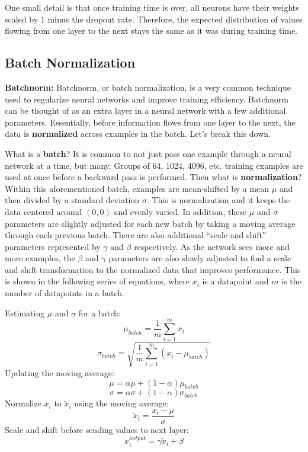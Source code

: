 \begin{flushleft}
    One small detail is that once training time is over, all neurons have their weights scaled by 1 minus the dropout rate. Therefore, the expected distribution of values flowing from one layer to the next stays the same as it was during training time.
\end{flushleft}

\subsection{Batch Normalization}
\begin{flushleft}
    \large \textbf{Batchnorm:} Batchnorm, or batch normalization, is a very common technique used to regularize neural networks and improve training efficiency. Batchnorm can be thought of as an extra layer in a neural network with a few additional parameters. Essentially, before information flows from one layer to the next, the data is \textbf{normalized} across examples in the batch. Let's break this down. \break
    
    What is a \textbf{batch}? It is common to not just pass one example through a neural network at a time, but many. Groups of 64, 1024, 4096, etc. training examples are used at once before a backward pass is performed. Then what is \textbf{normalization}? Within this aforementioned batch, examples are mean-shifted by a mean $\mu$ and then divided by a standard deviation $\sigma$. This is normalization and it keeps the data centered around $(0,0)$ and evenly varied. In addition, these $\mu$ and $\sigma$ parameters are slightly adjusted for each new batch by taking a moving average through each previous batch. There are also additional ``scale and shift'' parameters represented by $\gamma$ and $\beta$ respectively. As the network sees more and more examples, the $\beta$ and $\gamma$ parameters are also slowly adjusted to find a scale and shift transformation to the normalized data that improves performance. This is shown in the following series of equations, where $x_i$ is a datapoint and $m$ is the number of datapoints in a batch. \break

    Estimating $\mu$ and $\sigma$ for a batch:
    $$\mu_{batch} = \frac{1}{m}\sum_{i=1}^m x_i$$
    $$\sigma_{batch} = \sqrt{\frac{1}{m}\sum_{i=1}^m (x_i - \mu_{batch})}$$
    Updating the moving average:
    $$\mu = \alpha \mu + (1-\alpha)\mu_{batch}$$
    $$\sigma = \alpha \sigma + (1-\alpha)\sigma_{batch}$$
    Normalize $x_i$ to $\tilde{x}_i$ using the moving average:
    $$\tilde{x}_i = \frac{x_i - \mu}{\sigma}$$
    Scale and shift before sending values to next layer:
    $$x_i^{output} = \gamma\tilde{x}_i + \beta$$
    

\end{flushleft}
